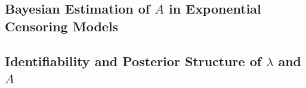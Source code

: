 \subsection{Bayesian Estimation of \texorpdfstring{$A$}{A} in Exponential Censoring Models}
\label{A_bayes}

\subsection{Identifiability and Posterior Structure of \texorpdfstring{$\lambda$}{lambda} and \texorpdfstring{$A$}{A}}















